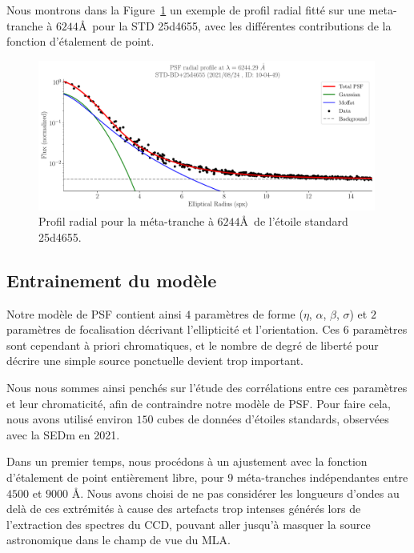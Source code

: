 \documentclass[../main/main.tex]{subfiles}
\begin{document}
Nous montrons dans la Figure~\ref{fig:radialprofile} un exemple de
profil radial fitté sur une meta-tranche à $6244$\AA\ pour la STD
25d4655, avec les différentes contributions de la fonction
d'étalement de point.
\begin{figure}[ht]
  \centering
  \includegraphics[width=0.99\textwidth]{../figures/06_irf/psfprofile.pdf}
  \caption[Exemple de profil radial d'un étoile standard]{Profil radial
    pour la méta-tranche à $6244$\AA\ de l'étoile standard 25d4655.}
  \label{fig:radialprofile}
\end{figure}

\subsection{Entrainement du modèle}\label{ssec:psftraining}

Notre modèle de PSF contient ainsi $4$ paramètres de forme ($\eta$,
$\alpha$, $\beta$, $\sigma$) et $2$ paramètres de focalisation décrivant
l'ellipticité et l'orientation. Ces $6$ paramètres sont cependant à
priori chromatiques, et le nombre de degré de liberté pour décrire une
simple source ponctuelle devient trop important.

Nous nous sommes ainsi penchés sur l'étude des corrélations entre ces
paramètres et leur chromaticité, afin de contraindre notre modèle de
PSF. Pour faire cela, nous avons utilisé environ $150$ cubes de
données d'étoiles standards, observées avec la SEDm en 2021.

Dans un premier temps, nous procédons à un ajustement avec la fonction
d'étalement de point entièrement libre, pour 9 méta-tranches indépendantes
entre $4500$ et $9000$ \AA. Nous avons choisi de ne pas considérer les
longueurs d'ondes au delà de ces extrémités à cause des artefacts trop intenses
générés lors de l'extraction des spectres du CCD, pouvant aller jusqu'à
masquer la source astronomique dans le champ de vue du MLA.
\end{document}
